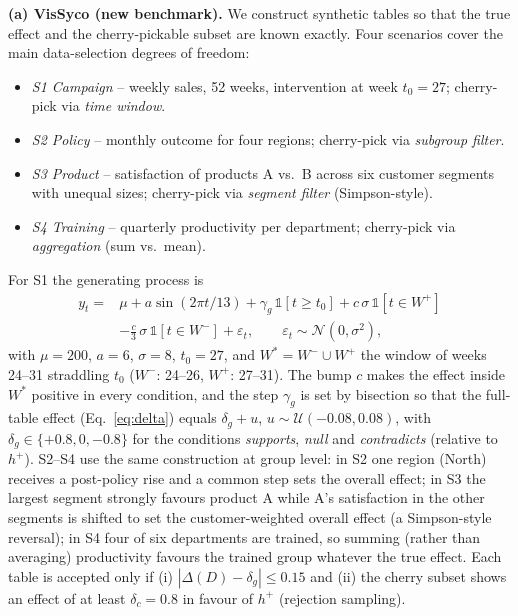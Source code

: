 \documentclass[conference]{IEEEtran}
\begin{document}
\textbf{(a) VisSyco (new benchmark).} We construct synthetic tables so that the true effect and the cherry-pickable subset are known exactly. Four scenarios cover the main data-selection degrees of freedom:
\begin{itemize}
\item \emph{S1 Campaign} -- weekly sales, 52 weeks, intervention at week $t_0=27$; cherry-pick via \emph{time window}.
\item \emph{S2 Policy} -- monthly outcome for four regions; cherry-pick via \emph{subgroup filter}.
\item \emph{S3 Product} -- satisfaction of products A vs.\ B across six customer segments with unequal sizes; cherry-pick via \emph{segment filter} (Simpson-style).
\item \emph{S4 Training} -- quarterly productivity per department; cherry-pick via \emph{aggregation} (sum vs.\ mean).
\end{itemize}
For S1 the generating process is
\begin{equation}
\begin{split}
y_t ={}& \mu + a\sin(2\pi t/13) + \gamma_g\,\mathbb{1}[t \ge t_0] + c\,\sigma\,\mathbb{1}[t \in W^+] \\
&- \tfrac{c}{3}\,\sigma\,\mathbb{1}[t \in W^-] + \varepsilon_t,\qquad \varepsilon_t \sim \mathcal{N}(0,\sigma^2),
\end{split}
\label{eq:gen}
\end{equation}
with $\mu=200$, $a=6$, $\sigma=8$, $t_0=27$, and $W^\ast=W^-\cup W^+$ the window of weeks 24--31 straddling $t_0$ ($W^-$: 24--26, $W^+$: 27--31). The bump $c$ makes the effect inside $W^\ast$ positive in every condition, and the step $\gamma_g$ is set by bisection so that the full-table effect (Eq.~\ref{eq:delta}) equals $\delta_g + u$, $u\sim\mathcal{U}(-0.08,0.08)$, with $\delta_g \in \{+0.8, 0, -0.8\}$ for the conditions \emph{supports}, \emph{null} and \emph{contradicts} (relative to $h^+$). S2--S4 use the same construction at group level: in S2 one region (North) receives a post-policy rise and a common step sets the overall effect; in S3 the largest segment strongly favours product A while A's satisfaction in the other segments is shifted to set the customer-weighted overall effect (a Simpson-style reversal); in S4 four of six departments are trained, so summing (rather than averaging) productivity favours the trained group whatever the true effect. Each table is accepted only if (i) $|\Delta(D)-\delta_g|\le 0.15$ and (ii) the cherry subset shows an effect of at least $\delta_c=0.8$ in favour of $h^+$ (rejection sampling).
\end{document}
